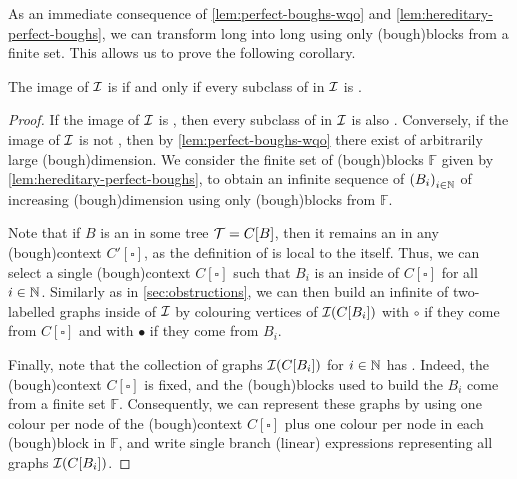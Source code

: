 As an immediate consequence of \cref{lem:perfect-boughs-wqo} and
\cref{lem:hereditary-perfect-boughs}, we can transform long  into long  using only \kl(bough){blocks}
from a finite set. This allows us to prove the following corollary.

\begin{corollary}
  \label{cor:hereditary-perfect-boughs-wqo}
  The image of $\mathcal{I}$ is 
  if and only if 
  every subclass of  in $\mathcal{I}$
  is .
\end{corollary}
\begin{proof}
  If the image of $\mathcal{I}$ is ,
  then every subclass of  in $\mathcal{I}$
  is also . Conversely,
  if the image of $\mathcal{I}$ is not ,
  then by \cref{lem:perfect-boughs-wqo} there exist 
  of arbitrarily large \kl(bough){dimension}. 
  We consider the finite set of \kl(bough){blocks} $\mathbb{F}$
  given by \cref{lem:hereditary-perfect-boughs},
  to obtain an infinite sequence of 
  $\seqof{B_i}[i \in \Nat]$ of increasing \kl(bough){dimension}
  using only \kl(bough){blocks} from $\mathbb{F}$.

  Note that if $B$ is an  in some tree $\t = C[B]$, then it
  remains an  in any \kl(bough){context} $C'[\square]$, as
  the definition of  is local to the  itself.
  Thus, we can select a single \kl(bough){context} $C[\square]$ such that
  $B_i$ is an  inside of $C[\square]$ for all $i \in \mathbb{N}$.
  Similarly as in \cref{sec:obstructions}, we can then build an infinite
   of two-labelled graphs inside of $\mathcal{I}$ by colouring
  vertices of $\mathcal{I}(C[B_i])$ with $\circ$ if they come from $C[\square]$
  and with $\bullet$ if they come from $B_i$. 

  Finally, note that the collection of graphs $\mathcal{I}(C[B_i])$ for $i
  \in \mathbb{N}$ has . Indeed, the
  \kl(bough){context} $C[\square]$ is fixed, and the \kl(bough){blocks} used
  to build the  $B_i$ come from a finite set $\mathbb{F}$. Consequently,
  we can represent these graphs by using one colour per node of
  the \kl(bough){context} $C[\square]$ plus one colour per node in each
  \kl(bough){block} in $\mathbb{F}$, and write single branch (linear)
  expressions representing all graphs $\mathcal{I}(C[B_i])$.
\end{proof}

